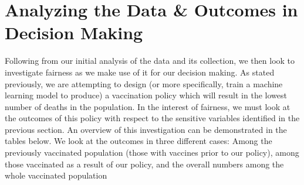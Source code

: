 \documentclass{article}
\begin{document}


\section{Analyzing the Data \& Outcomes in Decision Making}

Following from our initial analysis of the data and its collection, we then look to investigate fairness as we make use of it for our decision making. As stated previously, we are attempting to design (or more specifically, train a machine learning model to produce) a vaccination policy which will result in the lowest number of deaths in the population. In the interest of fairness, we must look at the outcomes of this policy with respect to the sensitive variables identified in the previous section. An overview of this investigation can be demonstrated in the tables below. We look at the outcomes in three different cases: Among the previously vaccinated population (those with vaccines prior to our policy), among those vaccinated as a result of our policy, and the overall numbers among the whole vaccinated population

\end{document}
